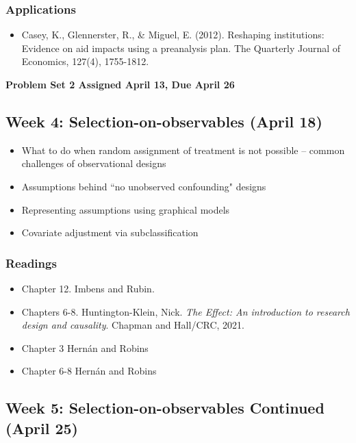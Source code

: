\documentclass[11pt, article, oneside]{memoir}
\theoremstyle{Assumption}
\begin{document}
\subsubsection*{Applications}

\begin{itemize}
\item Casey, K., Glennerster, R., \& Miguel, E. (2012). Reshaping institutions: Evidence on aid impacts using a preanalysis plan. The Quarterly Journal of Economics, 127(4), 1755-1812.
\end{itemize}


\textbf{Problem Set 2 Assigned April 13, Due April 26}

\subsection{Week 4: Selection-on-observables (April 18)}

\begin{itemize}
\item What to do when random assignment of treatment is not possible -- common challenges of observational designs
\item Assumptions behind ``no unobserved confounding" designs
\item Representing assumptions using graphical models
\item Covariate adjustment via subclassification
\end{itemize}

\subsubsection*{Readings}

\begin{itemize}
\item Chapter 12. Imbens and Rubin.
\item Chapters 6-8. Huntington-Klein, Nick. \emph{The Effect: An introduction to research design and causality}. Chapman and Hall/CRC, 2021.
\item Chapter 3 Hern\'an and  Robins
\item Chapter 6-8 Hern\'an and  Robins
\end{itemize}

\subsection{Week 5: Selection-on-observables Continued (April 25)}
\end{document}
